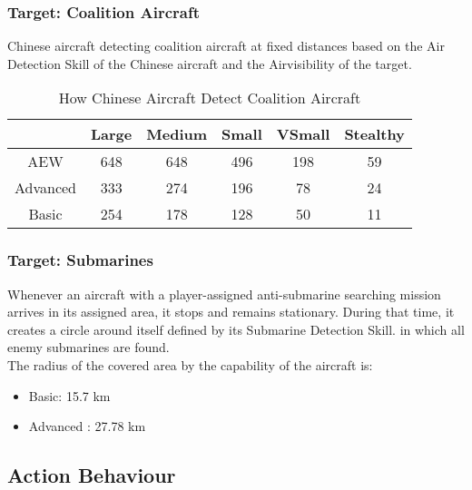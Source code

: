 \documentclass{article}
\begin{document}
    \subsubsection{Target: Coalition Aircraft}
    
    Chinese aircraft detecting coalition aircraft at fixed distances based on the Air Detection Skill of the Chinese aircraft and the Airvisibility of the target.
        \begin{table}[h!]
            \centering
            \begin{tabular}{|c|c|c|c|c|c|}
            \hline
             & Large & Medium & Small & VSmall & Stealthy \\ \hline
            AEW & 648 & 648 & 496 & 198 & 59 \\ \hline
            Advanced & 333 & 274 & 196 & 78 & 24 \\ \hline
            Basic & 254 & 178 & 128 & 50 & 11 \\ \hline
            \end{tabular}
            \caption{How Chinese Aircraft Detect Coalition Aircraft}
        \end{table}

    \subsubsection{Target: Submarines} 
    
    Whenever an aircraft with a player-assigned anti-submarine searching mission arrives in its assigned area, it stops and remains stationary. During that time, it creates a circle around itself defined by its Submarine Detection Skill. in which all enemy submarines are found. \\
          
    The radius of the covered area by the capability of the aircraft is:
    
    \begin{itemize}
        \item Basic: 15.7 km
        \item Advanced : 27.78 km
    \end{itemize}

\subsection{Action Behaviour}
\end{document}
